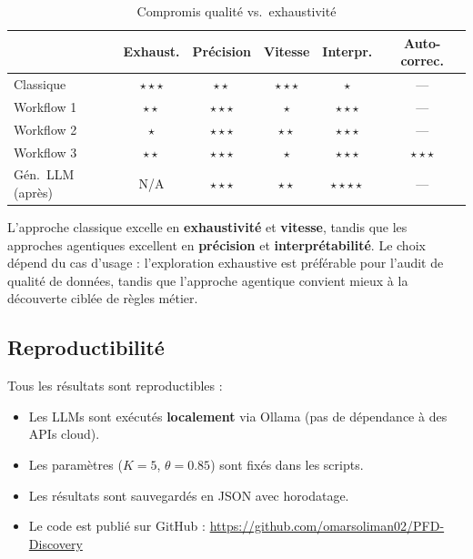 \documentclass[12pt,a4paper]{article}
\begin{document}
\begin{table}[H]
\centering
\caption{Compromis qualit\'{e} vs.\ exhaustivit\'{e}}
\label{tab:tradeoff}
\begin{tabular}{@{}lccccc@{}}
\toprule
& \textbf{Exhaust.} & \textbf{Pr\'{e}cision} & \textbf{Vitesse} & \textbf{Interpr.} & \textbf{Auto-correc.} \\
\midrule
Classique & $\star\star\star$ & $\star\star$ & $\star\star\star$ & $\star$ & --- \\
Workflow 1 & $\star\star$ & $\star\star\star$ & $\star$ & $\star\star\star$ & --- \\
Workflow 2 & $\star$ & $\star\star\star$ & $\star\star$ & $\star\star\star$ & --- \\
Workflow 3 & $\star\star$ & $\star\star\star$ & $\star$ & $\star\star\star$ & $\star\star\star$ \\
G\'{e}n.\ LLM (apr\`{e}s) & N/A & $\star\star\star$ & $\star\star$ & $\star\star\star\star$ & --- \\
\bottomrule
\end{tabular}
\end{table}

L'approche classique excelle en \textbf{exhaustivit\'{e}} et \textbf{vitesse}, tandis que les approches agentiques excellent en \textbf{pr\'{e}cision} et \textbf{interpr\'{e}tabilit\'{e}}. Le choix d\'{e}pend du cas d'usage : l'exploration exhaustive est pr\'{e}f\'{e}rable pour l'audit de qualit\'{e} de donn\'{e}es, tandis que l'approche agentique convient mieux \`{a} la d\'{e}couverte cibl\'{e}e de r\`{e}gles m\'{e}tier.

\subsection{Reproductibilit\'{e}}

Tous les r\'{e}sultats sont reproductibles :
\begin{itemize}
    \item Les LLMs sont ex\'{e}cut\'{e}s \textbf{localement} via Ollama (pas de d\'{e}pendance \`{a} des APIs cloud).
    \item Les param\`{e}tres ($K=5$, $\theta=0.85$) sont fix\'{e}s dans les scripts.
    \item Les r\'{e}sultats sont sauvegard\'{e}s en JSON avec horodatage.
    \item Le code est publi\'{e} sur GitHub : \url{https://github.com/omarsoliman02/PFD-Discovery}
\end{itemize}
\end{document}
